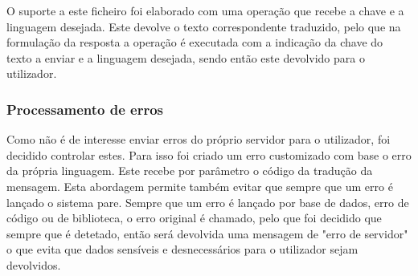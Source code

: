 O suporte a este ficheiro foi elaborado com uma operação que recebe a chave e a linguagem desejada. Este devolve o texto correspondente traduzido, pelo que na formulação da resposta a operação é executada com a indicação da chave do texto a enviar e a linguagem desejada, sendo então este devolvido para o utilizador.

\newpage

\subsubsection{Processamento de erros}
Como não é de interesse enviar erros do próprio servidor para o utilizador, foi decidido controlar estes. Para isso foi criado um erro customizado com base o erro da própria linguagem. Este recebe por parâmetro o código da tradução da mensagem. Esta abordagem permite também evitar que sempre que um erro é lançado o sistema pare. Sempre que um erro é lançado por base de dados, erro de código ou de biblioteca, o erro original é chamado, pelo que foi decidido que sempre que é detetado, então será devolvida uma mensagem de "erro de servidor" o que evita que dados sensíveis e desnecessários para o utilizador sejam devolvidos.